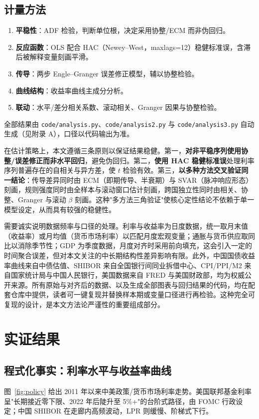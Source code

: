 \documentclass[12pt,a4paper]{ctexart}
\newcommand{\code}[1]{\texttt{#1}}
\begin{document}
\subsection{计量方法}
\begin{enumerate}[leftmargin=2em]
\item \textbf{平稳性}：ADF 检验，判断单位根，决定采用协整/ECM 而非伪回归。
\item \textbf{反应函数}：OLS 配合 HAC（Newey--West，maxlags=12）稳健标准误，含滞后被解释变量刻画平滑。
\item \textbf{传导}：两步 Engle--Granger 误差修正模型，辅以协整检验。
\item \textbf{曲线结构}：收益率曲线主成分分析。
\item \textbf{联动}：水平/差分相关系数、滚动相关、Granger 因果与协整检验。
\end{enumerate}
全部结果由 \code{code/analysis.py}、\code{code/analysis2.py} 与 \code{code/analysis3.py} 自动生成（见附录 A），口径以代码输出为准。

在估计策略上，本文遵循三条原则以保证结果稳健。第一，\textbf{对非平稳序列使用协整/误差修正而非水平回归}，避免伪回归。第二，\textbf{使用 HAC 稳健标准误}处理利率序列普遍存在的自相关与异方差，使 $t$ 检验有效。第三，\textbf{以多种方法交叉验证同一结论}：传导差异同时由 ECM（即期传导、半衰期）与 SVAR（脉冲响应形态）刻画，规则强度同时由全样本与滚动窗口估计刻画，跨国独立性同时由相关、协整、Granger 与滚动 $\beta$ 刻画。这种"多方法三角验证"使核心定性结论不依赖于单一模型设定，从而具有较强的稳健性。

需要诚实说明数据频率与口径的处理。利率与收益率为日度数据，统一取月末值（收益率）或月均值（货币市场利率）以匹配月度宏观变量；通胀与货币供应取同比以消除季节性；GDP 为季度数据，月度对齐时采用前向填充，这会引入一定的时间聚合误差，但对本文关注的中长期结构性差异影响有限。此外，中国国债收益率曲线来自中债估值、SHIBOR 来自全国银行间同业拆借中心、CPI/PPI/M2 来自国家统计局与中国人民银行，美国数据来自 FRED 与美国财政部，均为权威公开来源。所有原始与对齐后的数据、以及生成全部图表与回归结果的代码，均在配套仓库中提供，读者可一键复现并替换样本期或变量口径进行再检验。这种完全可复现的设计，是本文方法论严谨性的重要组成部分。

\section{实证结果}

\subsection{程式化事实：利率水平与收益率曲线}
图~\ref{fig:policy} 给出 2011 年以来中美政策/货币市场利率走势。美国联邦基金利率呈"长期接近零下限、2022 年后陡升至 5\%+"的台阶式路径，由 FOMC 行政设定；中国 SHIBOR 在走廊内高频波动，LPR 则缓慢、阶梯式下行。
\end{document}
